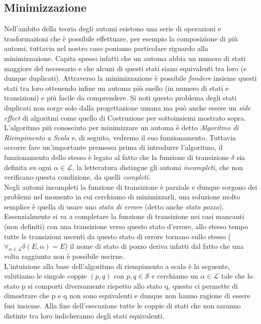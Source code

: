 \subsection{Minimizzazione}
Nell'ambito della teoria degli automi esistono una serie di operazioni e trasformazioni che è possibile effettuare, per esempio la composizione di più automi, tuttavia nel nostro caso poniamo particolare riguardo alla minimizzazione. Capita spesso infatti che un automa abbia un numero di stati maggiore del necessario e che alcuni di questi stati siano equivalenti tra loro (e dunque duplicati). Attraverso la minimizzazione è possibile \emph{fondere} insieme questi stati tra loro ottenendo infine un automa più snello (in numero di stati e transizioni) e più facile da comprendere. Si noti questo problema degli stati duplicati non sorge solo dalla progettazione umana ma può anche essere un \emph{side effect} di algoritmi come quello di Costruzione per sottoinsiemi mostrato sopra.\\
L'algoritmo più conosciuto per minimizzare un automa è detto \emph{Algoritmo di Riempimento a Scala}\cite{Linguaggi_di_Prorgammazione} e, di seguito, vedremo il suo funzionamento. Tuttavia occorre fare un'importante premessa prima di introdurre l'algoritmo, il funzionamento dello stesso è legato al fatto che la funzione di transizione $\delta$ sia definita su ogni $\alpha \in \mathcal{L}$, la letteratura distingue gli automi \emph{incompleti}, che non verificano questa condizione, da quelli \emph{completi}.\\
Negli automi incompleti la funzione di transizione è parziale e dunque sorgono dei problemi nel momento in cui cerchiamo di minimizzarli, una soluzione molto semplice è quella di usare uno \emph{stato di errore} (detto anche \emph{stato pozzo}). Essenzialmente si va a completare la funzione di transizione nei casi mancanti (non definiti) con una transizione verso questo stato d'errore, allo stesso tempo tutte le transizioni uscenti da questo stato di errore tornano sullo stesso ($\forall_{ \alpha \in \mathcal{L}} \delta(E, \alpha) = E$) il nome di stato di pozzo deriva infatti dal fatto che una volta raggiunto non è possibile uscirne.\\
L'intuizione alla base dell'algoritmo di riempimento a scala è la seguente, valutiamo le singole coppie $(p, q)$ con $p, q \in \mathcal{S}$ e cerchiamo un $\alpha \in \mathcal{L}$ tale che lo stato p si comporti diversamente rispetto allo stato q, questo ci permette di dimostrare che p e q non sono equivalenti e dunque non hanno ragione di essere fusi insieme. Alla fine dell'esecuzione tutte le coppie di stati che non saranno distinte tra loro indicheranno degli stati equivalenti.\\
